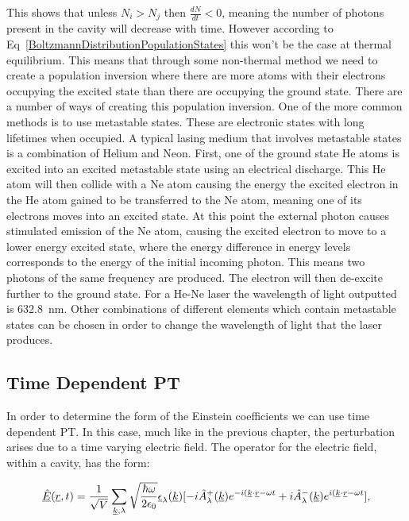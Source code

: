 \noindent This shows that unless $N_i > N_j$ then $\frac{dN}{dt} < 0$, meaning the number of photons present in the cavity will decrease with time. However according to Eq~\ref{BoltzmannDistributionPopulationStates} this won't be the case at thermal equilibrium. This means that through some non-thermal method we need to create a population inversion where there are more atoms with their electrons occupying the excited state than there are occupying the ground state. There are a number of ways of creating this population inversion. One of the more common methods is to use metastable states. These are electronic states with long lifetimes when occupied. A typical lasing medium that involves metastable states is a combination of Helium and Neon. First, one of the ground state He atoms is excited into an excited metastable state using an electrical discharge. This He atom will then collide with a Ne atom causing the energy the excited electron in the He atom gained to be transferred to the Ne atom, meaning one of its electrons moves into an excited state. At this point the external photon causes stimulated emission of the Ne atom, causing the excited electron to move to a lower energy excited state, where the energy difference in energy levels corresponds to the energy of the initial incoming photon. This means two photons of the same frequency are produced. The electron will then de-excite further to the ground state. For a He-Ne laser the wavelength of light outputted is 632.8~nm. Other combinations of different elements which contain metastable states can be chosen in order to change the wavelength of light that the laser produces.

\subsection{Time Dependent PT}

In order to determine the form of the Einstein coefficients we can use time dependent PT. In this case, much like in the previous chapter, the perturbation arises due to a time varying electric field. The operator for the electric field, within a cavity, has the form:

\begin{equation}
    \underline{\Hat{E}}(\underline{r}, t) = \frac{1}{\sqrt{V}} \sum_{\underline{k}, \lambda}\sqrt{\frac{\hbar \omega}{2 \epsilon_0}} \underline{\epsilon}_\lambda (\underline{k}) [-i\Hat{A}^+_\lambda(\underline{k}) e^{-i(\underline{k}\cdot\underline{r} - \omega t} + i\Hat{A}^-_\lambda(\underline{k}) e^{i(\underline{k} \cdot \underline{r} - \omega t}],
    \label{ElectricFieldOperator}
\end{equation}

